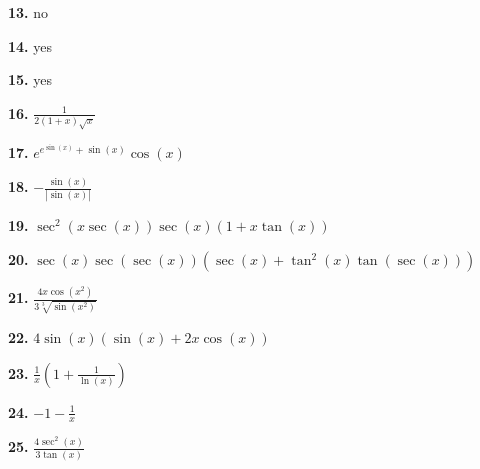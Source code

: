 \documentclass[12pt,]{book}
\theoremstyle{plain}
\theoremstyle{definition}
\numberwithin{equation}{section}
\newcommand{\fe}[2]{#1\mathopen{}\left(#2\right)\mathclose{}}
\newcommand{\abs}[1]{\left|#1\right|}
\begin{document}
                \par\smallskip
\noindent\textbf{13.}\quad{}
                    no%

                \par\smallskip
\noindent\textbf{14.}\quad{}
                    yes%

                \par\smallskip
\noindent\textbf{15.}\quad{}
                    yes%

                \par\smallskip
\noindent\textbf{16.}\quad{}
                    \(\frac{1}{2(1+x)\sqrt{x}}\)%

                \par\smallskip
\noindent\textbf{17.}\quad{}
                    \(e^{e^{\fe{\sin}{x}}+\fe{\sin}{x}}\fe{\cos}{x}\)%

                \par\smallskip
\noindent\textbf{18.}\quad{}
                    \(-\frac{\fe{\sin}{x}}{\abs{\fe{\sin}{x}}}\)%

                \par\smallskip
\noindent\textbf{19.}\quad{}
                    \(\fe{\sec^2}{x\fe{\sec}{x}}\fe{\sec}{x}\left(1+x\fe{\tan}{x}\right)\)%

                \par\smallskip
\noindent\textbf{20.}\quad{}
                    \(\fe{\sec}{x}\fe{\sec}{\fe{\sec}{x}}\left(\fe{\sec}{x}+\fe{\tan^2}{x}\fe{\tan}{\fe{\sec}{x}}\right)\)%

                \par\smallskip
\noindent\textbf{21.}\quad{}
                    \(\frac{4x\fe{\cos}{x^2}}{3\sqrt[3]{\fe{\sin}{x^2}}}\)%

                \par\smallskip
\noindent\textbf{22.}\quad{}
                    \(4\fe{\sin}{x}\left(\fe{\sin}{x}+2x\fe{\cos}{x}\right)\)%

                \par\smallskip
\noindent\textbf{23.}\quad{}
                    \(\frac{1}{x}\left(1+\frac{1}{\fe{\ln}{x}}\right)\)%

                \par\smallskip
\noindent\textbf{24.}\quad{}
                    \(-1-\frac{1}{x}\)%

                \par\smallskip
\noindent\textbf{25.}\quad{}
                    \(\frac{4\fe{\sec^2}{x}}{3\fe{\tan}{x}}\)%
\end{document}
